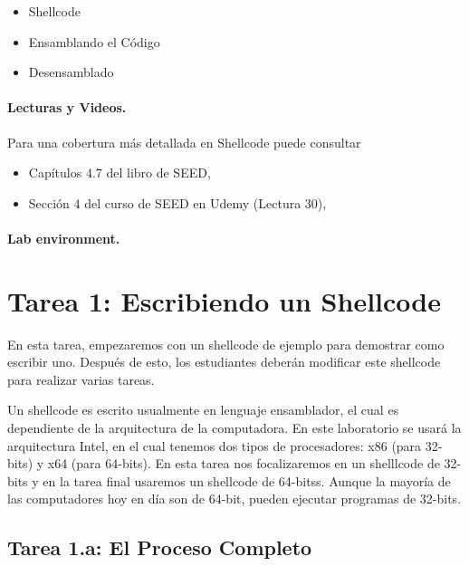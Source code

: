 \begin{itemize}[noitemsep]
\item Shellcode
\item Ensamblando el Código
\item Desensamblado 
\end{itemize}


\paragraph{Lecturas y Videos.}
Para una cobertura más detallada en Shellcode puede consultar

\begin{itemize}
\item Capítulos 4.7 del libro de SEED, \seedbook
\item Sección 4 del curso de SEED en Udemy (Lectura 30), \seedcsvideo
\end{itemize}


\paragraph{Lab environment.} \seedenvironmentC


\section{Tarea 1: Escribiendo un Shellcode}

En esta tarea, empezaremos con un shellcode de ejemplo para demostrar como escribir uno. Después de esto, los estudiantes deberán modificar este shellcode para realizar varias tareas.

Un shellcode es escrito usualmente en lenguaje ensamblador, el cual es dependiente de la arquitectura de la computadora. En este laboratorio se usará la arquitectura Intel, en el cual tenemos dos tipos de procesadores:
x86 (para 32-bits) y x64 (para 64-bits). En esta tarea nos focalizaremos en un shelllcode de 32-bits y en la tarea final usaremos un shellcode de 64-bitss.
Aunque la mayoría de las computadores hoy en día son de 64-bit, pueden ejecutar programas de 32-bits.


\subsection{Tarea 1.a: El Proceso Completo}

